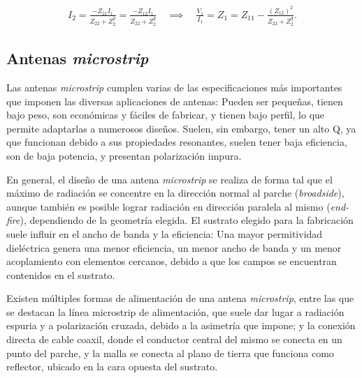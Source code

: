 \begin{align}
	\label{eq:impedanciaAntenaEnArray}
	I_2 = \frac{-Z_{21}I_1}{Z_{22}+Z^g_{2}} = \frac{-Z_{12}I_1}{Z_{22}+Z^g_{2}}  \quad \implies \quad
	\frac{V_1}{I_1} = Z_1 = Z_{11} - \frac{(Z_{12})^2}{Z_{22}+Z^g_2}.
\end{align}


\subsection{Antenas \textit{microstrip}}
\label{subsec_antenas_microstrip}
Las antenas \textit{microstrip} cumplen varias de las especificaciones más importantes que imponen las diversas aplicaciones de antenas: Pueden ser pequeñas, tienen bajo peso, son económicas y fáciles de fabricar, y tienen bajo perfil, lo que permite adaptarlas a numerosos diseños. Suelen, sin embargo, tener un alto Q, ya que funcionan debido a sus propiedades resonantes, suelen tener baja eficiencia, son de baja potencia, y presentan polarización impura.

En general, el diseño de una antena \textit{microstrip} se realiza de forma tal que el máximo de radiación se concentre en la dirección normal al parche (\textit{broadside}), aunque también es posible lograr radiación en dirección paralela al mismo (\textit{end-fire}), dependiendo de la geometría elegida. El sustrato elegido para la fabricación suele influir en el ancho de banda y la eficiencia: Una mayor permitividad dieléctrica genera una menor eficiencia, un menor ancho de banda y un menor acoplamiento con elementos cercanos, debido a que los campos se encuentran contenidos en el sustrato.

Existen múltiples formas de alimentación de una antena \textit{microstrip}, entre las que se destacan la línea microstrip de alimentación, que suele dar lugar a radiación espuria y a polarización cruzada, debido a la asimetría que impone; y la conexión directa de cable coaxil, donde el conductor central del mismo se conecta en un punto del parche, y la malla se conecta al plano de tierra que funciona como reflector, ubicado en la cara opuesta del sustrato.

